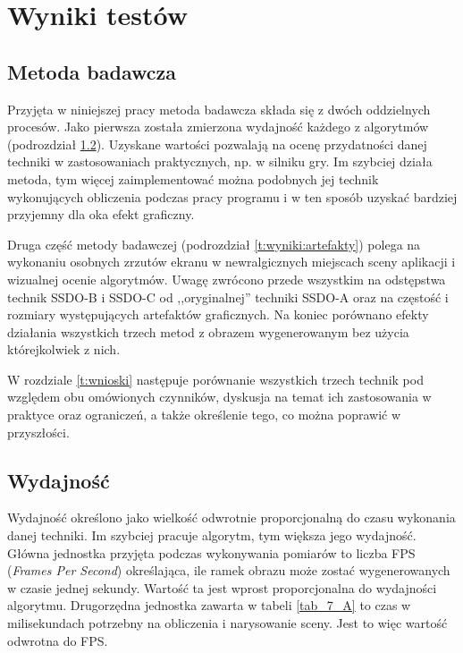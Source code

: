 \chapter{Wyniki testów}
\label{t:wyniki}

	\section{Metoda badawcza}
	\label{t:wyniki:metoda}
	
	
	Przyjęta w niniejszej pracy metoda badawcza składa się z dwóch oddzielnych procesów. Jako pierwsza została zmierzona wydajność każdego z algorytmów (podrozdział \ref{t:wyniki:wydajnosc}). Uzyskane wartości pozwalają na ocenę przydatności danej techniki w zastosowaniach praktycznych, np. w silniku gry. Im szybciej działa metoda, tym więcej zaimplementować można podobnych jej technik wykonujących obliczenia podczas pracy programu i w ten sposób uzyskać bardziej przyjemny dla oka efekt graficzny.
	
	Druga część metody badawczej (podrozdział \ref{t:wyniki:artefakty}) polega na wykonaniu osobnych zrzutów ekranu w newralgicznych miejscach sceny aplikacji i wizualnej ocenie algorytmów. Uwagę zwrócono przede wszystkim na odstępstwa technik SSDO-B i SSDO-C od ,,oryginalnej'' techniki SSDO-A oraz na częstość i rozmiary występujących artefaktów graficznych. Na koniec porównano efekty działania wszystkich trzech metod z obrazem wygenerowanym bez użycia którejkolwiek z nich.
	
	W rozdziale \ref{t:wnioski} następuje porównanie wszystkich trzech technik pod względem obu omówionych czynników, dyskusja na temat ich zastosowania w praktyce oraz ograniczeń, a także określenie tego, co można poprawić w przyszłości.
	
	\section{Wydajność}
	\label{t:wyniki:wydajnosc}
	
	
	
	
	Wydajność określono jako wielkość odwrotnie proporcjonalną do czasu wykonania danej techniki. Im szybciej pracuje algorytm, tym większa jego wydajność. Główna jednostka przyjęta podczas wykonywania pomiarów to liczba FPS (\emph{Frames Per Second}) określająca, ile ramek obrazu może zostać wygenerowanych w czasie jednej sekundy. Wartość ta jest wprost proporcjonalna do wydajności algorytmu. Drugorzędna jednostka zawarta w tabeli \ref{tab_7_A} to czas w milisekundach potrzebny na obliczenia i narysowanie sceny. Jest to więc wartość odwrotna do FPS.
	
